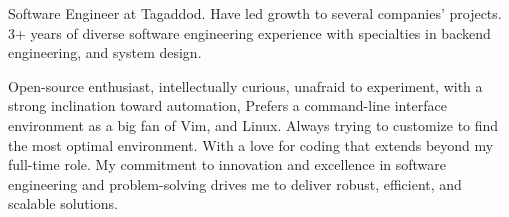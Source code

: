 

\begin{cvparagraph}

Software Engineer at Tagaddod. Have led growth to several companies' projects. 3+ years of diverse software engineering experience with specialties in backend engineering, and system design.

Open-source enthusiast, intellectually curious, unafraid to experiment, with a strong inclination toward automation, Prefers a command-line interface environment as a big fan of Vim, and Linux. Always trying to customize to find the most optimal environment. With a love for coding that extends beyond my full-time role. My commitment to innovation and excellence in software engineering and problem-solving drives me to deliver robust, efficient, and scalable solutions.
\end{cvparagraph}
